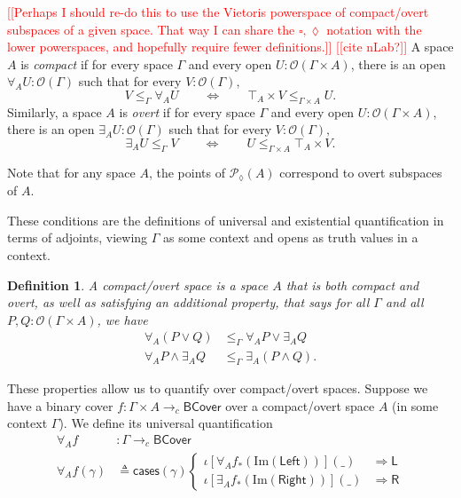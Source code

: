 \documentclass[conference]{IEEEtran}
\newtheorem{definition}{Definition}
\newcommand{\PLower}{\mathcal{P}_\lozenge}
\newcommand{\cto}{\to_c}
\newcommand{\Open}[1]{\mathcal{O}({#1})}
\newcommand{\wildcard}{\_}
\newcommand{\Img}[1]{\text{Im}\left({#1}\right)}
\newcommand{\oinclf}[1]{\iota[{#1}]}
\newcommand{\oincl}[2]{\oinclf{#1} \left({#2}\right)}
\newcommand{\Branch}{\Rightarrow}
\newcommand{\note}[1]{\textcolor{red}{[[{#1}]]}}
\newcommand{\BCover}{\mathsf{BCover}}
\begin{document}
\note{Perhaps I should re-do this to use the Vietoris powerspace of compact/overt subspaces of a given space. That way I can share the $\square, \lozenge$ notation with the lower powerspaces, and hopefully require fewer definitions.}
\note{cite nLab?}
A space $A$ is \emph{compact} if for every space $\Gamma$ and every open $U : \Open{\Gamma \times A}$, there is an open $\forall_A U : \Open{\Gamma}$ such that for every $V : \Open{\Gamma},$
\[
V \le_\Gamma \forall_A U \qquad \Leftrightarrow \qquad \top_A \times V \le_{\Gamma \times A} U.
\]
Similarly, a space $A$ is \emph{overt} if for every space $\Gamma$ and every open $U : \Open{\Gamma \times A}$, there is an open $\exists_A U : \Open{\Gamma}$ such that for every $V : \Open{\Gamma},$
\[
\exists_A U \le_\Gamma V  \qquad \Leftrightarrow \qquad U  \le_{\Gamma \times A} \top_A \times V.
\]

Note that for any space $A$, the points of $\PLower(A)$ correspond to overt subspaces of $A$.

These conditions are the definitions of universal and existential quantification in terms of adjoints, viewing $\Gamma$ as some context and opens as truth values in a context.

\begin{definition}
A \emph{compact/overt} space is a space $A$ that is both compact and overt, as well as satisfying an additional property, that says for all $\Gamma$ and all $P, Q : \Open{\Gamma \times A}$, we have
\begin{align*}
\forall_A(P \vee Q) &\le_\Gamma \forall_A P \vee \exists_A Q
\\  \forall_A P \wedge \exists_A Q &\le_\Gamma \exists_A (P \wedge Q).
\end{align*}
\end{definition}
These properties allow us to quantify over compact/overt spaces. Suppose we have a binary cover $f : \Gamma \times A \cto \BCover$ over a compact/overt space $A$ (in some context $\Gamma$). We define its universal quantification
\begin{align*}
\forall_A f &: \Gamma \cto \BCover
\\ \forall_A f(\gamma) &\triangleq \mathsf{cases}(\mathsf{\gamma})
\begin{cases}
\oincl{\forall_A f_*(\Img{\mathsf{Left}})}{\wildcard} &\Branch \mathsf{L}
\\ \oincl{\exists_A f_*(\Img{\mathsf{Right}})}{\wildcard} &\Branch \mathsf{R}
\end{cases}
\end{align*}
\end{document}
